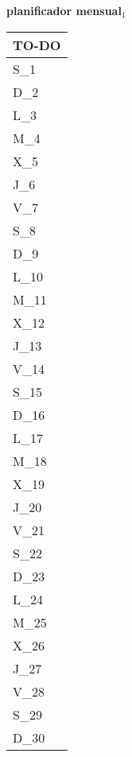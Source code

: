 \clearpage
\raggedright{
	\fontsize{25}{50}\selectfont
	\textbf{\NextYear}
}\scriptsize{\textbf{planificador mensual$_1$}}\\[11.3pt]



	\noindent\dotfill
	\renewcommand{\arraystretch}{1.5}\scriptsize
		\begin{longtabu} to \textwidth { X[l]}
		\centering \small{\textbf{TO-DO}} \\
		\toprule
		S_{1} \dotfill\\
		D_{2} \dotfill\\
		\hline
		L_{3} \dotfill\\
		M_{4} \dotfill\\
		X_{5} \dotfill\\
		J_{6} \dotfill\\
		V_{7} \dotfill\\
		S_{8} \dotfill\\
		D_{9} \dotfill\\
		\hline
		L_{10} \dotfill\\
		M_{11} \dotfill\\
		X_{12} \dotfill\\
		J_{13} \dotfill\\
		V_{14} \dotfill\\
		S_{15} \dotfill\\
		D_{16} \dotfill\\
		\hline
		L_{17} \dotfill\\
		M_{18} \dotfill\\
		X_{19} \dotfill\\
		J_{20} \dotfill\\
		V_{21} \dotfill\\
		S_{22} \dotfill\\
		D_{23} \dotfill\\
		\hline
		L_{24} \dotfill\\
		M_{25} \dotfill\\
		X_{26} \dotfill\\
		J_{27} \dotfill\\
		V_{28} \dotfill\\
		S_{29} \dotfill\\
		D_{30} \dotfill\\
		\hline

		\bottomrule

	\end{longtabu}


\clearpage
